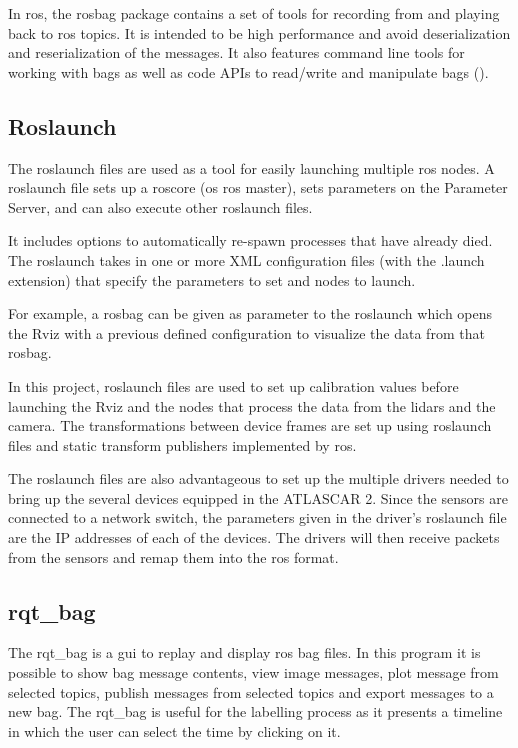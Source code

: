 In \gls{ros}, the rosbag package contains a set of tools for recording from and playing back to \gls{ros} topics. It is intended to be high performance and avoid deserialization and reserialization of the messages. It also features command line tools for working with bags as well as code APIs to read/write and manipulate bags (\cite{ROSWikia}).

\subsection{Roslaunch}
The roslaunch files are used as a tool for easily launching multiple \gls{ros} nodes. A roslaunch file sets up a roscore (os \gls{ros} master), sets parameters on the Parameter Server, and can also execute other roslaunch files. 

It includes options to automatically re-spawn processes that have already died. The roslaunch takes in one or more XML configuration files (with the .launch extension) that specify the parameters to set and nodes to launch.

For example, a rosbag can be given as parameter to the roslaunch which opens the Rviz with a previous defined configuration to visualize the data from that rosbag.

In this project, roslaunch files are used to set up calibration values before launching the Rviz and the nodes that process the data from the \gls{lidar}s and the camera. The transformations between device frames are set up using roslaunch files and static transform publishers implemented by \gls{ros}. 

The roslaunch files are also advantageous to set up the multiple drivers needed to bring up the several devices equipped in the ATLASCAR 2. Since the sensors are connected to a network switch, the parameters given in the driver's roslaunch file are the IP addresses of each of the devices. The drivers will then receive packets from the sensors and remap them into the \gls{ros} format.

\subsection{rqt\_bag}

The rqt\_bag is a \gls{gui} to replay and display \gls{ros} bag files. In this program it is possible to show bag message contents, view image messages, plot message from selected topics, publish messages from selected topics and export messages to a new bag. The rqt\_bag is useful for the labelling process as it presents a timeline in which the user can select the time by clicking on it.



